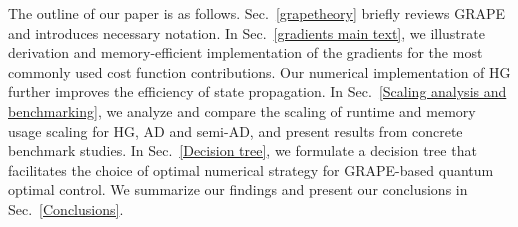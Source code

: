 The outline of our paper is as follows. Sec.\ \ref{grapetheory} briefly reviews GRAPE and introduces necessary notation. In Sec.\ \ref{gradients main text}, we illustrate derivation and memory-efficient implementation of the gradients for the most commonly used cost function contributions. Our numerical implementation of HG further improves the efficiency of state propagation. In Sec.\ \ref{Scaling analysis and benchmarking}, we analyze and compare the scaling of runtime and memory usage scaling for HG, AD and semi-AD, and present results from concrete benchmark studies. In Sec.\ \ref{Decision tree}, we formulate a decision tree that facilitates the choice of optimal numerical strategy for GRAPE-based quantum optimal control. We summarize our findings and present our conclusions in Sec.\ \ref{Conclusions}.
